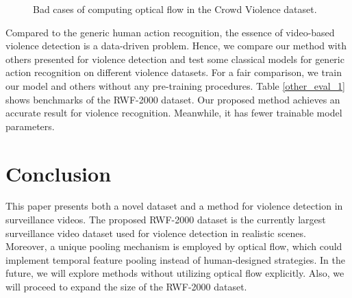 \documentclass[a4paper,conference]{IEEEtran}
\begin{document}
\begin{table}[!t]
  \centering
  \renewcommand\arraystretch{1.25}
  \caption{Comparisons between the proposed method and others on the RWF-2000 dataset}
  \label{other_eval_1}
\end{table}


\begin{figure}[t]
\centering
\label{opt_case}
\caption{Bad cases of computing optical flow in the Crowd Violence dataset.}
\end{figure}

Compared to the generic human action recognition, the essence of video-based violence detection is a data-driven problem. Hence, we compare our method with others presented for violence detection and test some classical models for generic action recognition on different violence datasets. For a fair comparison, we train our model and others without any pre-training procedures.  Table \ref{other_eval_1} shows benchmarks of the RWF-2000 dataset. Our proposed method achieves an accurate result for violence recognition. Meanwhile, it has fewer trainable model parameters. 


\section{Conclusion}
This paper presents both a novel dataset and a method for violence detection in surveillance videos. The proposed RWF-2000 dataset is the currently largest surveillance video dataset used for violence detection in realistic scenes. Moreover, a unique pooling mechanism is employed by optical flow, which could implement temporal feature pooling instead of human-designed strategies. In the future, we will explore methods without utilizing optical flow explicitly. Also, we will proceed to expand the size of the RWF-2000 dataset.
\end{document}
